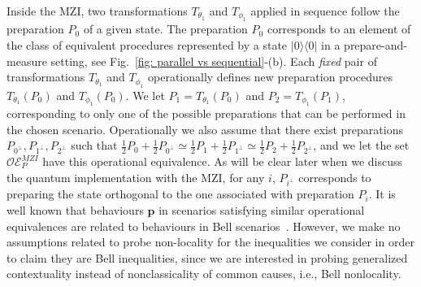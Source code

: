 \documentclass[a4paper,twocolumn,11pt,accepted=2024-01-17]{quantumarticle}
\begin{document}
Inside the MZI, two transformations $T_{\theta_1}$ and $T_{\phi_1}$ applied in sequence follow the preparation $P_0$ of a given state. The preparation $P_0$ corresponds to an element of the class of equivalent procedures represented by a state $\vert 0 \rangle \langle 0 \vert$ in a prepare-and-measure setting, see Fig.~\ref{fig: parallel vs sequential}-(b). Each \textit{fixed} pair of transformations $T_{\theta_1}$ and $T_{\phi_1}$ operationally defines new preparation procedures $T_{\theta_1}(P_0)$ and $T_{\phi_1}(P_0)$. We let $P_1 = T_{\theta_1}(P_0)$ and $P_2 = T_{\phi_1}(P_1)$, corresponding to only one of the possible preparations that can be performed in the chosen scenario. Operationally we also assume that there exist preparations $P_{0^\perp},P_{1^\perp},P_{2^\perp}$ such that $\frac{1}{2}P_0+\frac{1}{2}P_{0^\perp}\simeq \frac{1}{2}P_1+\frac{1}{2}P_{1^\perp} \simeq \frac{1}{2}P_{2}+\frac{1}{2}P_{2^\perp}$, and we let the set $\mathcal{OE}_P^{MZI}$ have this operational equivalence. {As will be clear later when we discuss the quantum implementation with the MZI, for any $i$, $P_{i^\perp}$ corresponds to preparing the state orthogonal to the one associated with preparation $P_i$.} It is well known that behaviours $\mathbf{p}$ in scenarios satisfying similar operational equivalences are related to behaviours in Bell scenarios~\cite{chaturvedi2021characterising}. However, we make no assumptions related to probe non-locality for the inequalities we consider in order to claim they are Bell inequalities, since we are interested in probing generalized contextuality instead of nonclassicality of common causes, i.e., Bell nonlocality.
\end{document}
